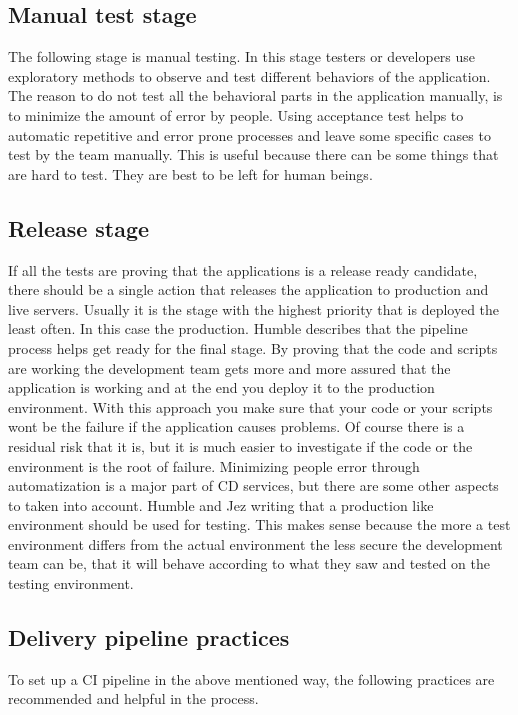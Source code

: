 \subsection{Manual test stage}
The following stage is manual testing. In this stage testers or developers use exploratory methods to observe and test different behaviors
of the application. The reason to do not test all the behavioral parts in the application manually, is to minimize the amount of error by people.
Using acceptance test helps to automatic repetitive and error prone processes and leave some specific cases to test by the team manually.
This is useful because there can be some things that are hard to test. They are best to be left for human beings.

\subsection{Release stage}
If all the tests are proving that the applications is a release ready candidate, there should be a single action that releases the application to production and
live servers. Usually it is the stage with the highest priority that is deployed the least often. In this case the production. Humble describes that the pipeline
process helps get ready for the final stage. By proving that the code and scripts are working the development team gets more and more assured that the application
is working and at the end you deploy it to the production environment. With this approach you make sure that your code or your scripts wont be the failure if
the application causes problems. Of course there is a residual risk that it is, but it is much easier to investigate if the code or the environment is the
root of failure. Minimizing people error through automatization is a major part of CD services, but there are some other aspects to taken into account. Humble and Jez writing
that a production like environment should be used for testing. This makes sense because the more a test environment differs from the actual environment
the less secure the development team can be, that it will behave according to what they saw and tested on the testing environment.

\subsection{Delivery pipeline practices}
To set up a CI pipeline in the above mentioned way, the following practices are recommended and helpful in the process.

